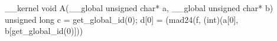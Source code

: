 __kernel void A(__global unsigned char* a, __global unsigned char* b) {
  unsigned long c = get_global_id(0);
  d[0] = (mad24(f, (int)(a[0], b[get_global_id(0)])) %
}

